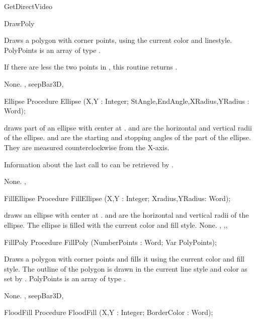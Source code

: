 \begin{function}{GetDirectVideo}
\begin{procedure}{DrawPoly}
\Description

Draws a polygon with  corner points, using the
current color and linestyle. PolyPoints is an array of type .

If there are less the two points in , this routine
returns .

\Errors
None.
\SeeAlso
{}, seep{Bar3D}, 
\end{procedure}

\begin{procedure}{Ellipse}
\Declaration
Procedure Ellipse (X,Y : Integer; StAngle,EndAngle,XRadius,YRadius : Word);

\Description
  draws part of an ellipse with center at .
 and  are the horizontal and vertical radii of the
ellipse.  and  are the starting and stopping angles of
the part of the ellipse. They are measured counterclockwise from the X-axis.

Information about the last call to  can be retrieved by
.

\Errors
None.
\SeeAlso
{} , 
\end{procedure}
\begin{procedure}{FillEllipse}
\Declaration
Procedure FillEllipse (X,Y : Integer; Xradius,YRadius: Word);

\Description
  draws an ellipse with center at .
 and  are the horizontal and vertical radii of the
ellipse. The ellipse is filled with the current color and fill style.
\Errors
None.
\SeeAlso
{} ,
,, 
\end{procedure}

\begin{procedure}{FillPoly}
\Declaration
Procedure FillPoly (NumberPoints : Word; Var PolyPoints);

\Description

Draws a polygon with  corner points and fills it
using the current color and fill style. The outline of the polygon
is drawn in the current line style and color as set by .
PolyPoints is an array of type .

\Errors
None.
\SeeAlso
{}, seep{Bar3D}, 
\end{procedure}
\begin{procedure}{FloodFill}
\Declaration
Procedure FloodFill (X,Y : Integer; BorderColor : Word);


\end{procedure}
\end{function}
